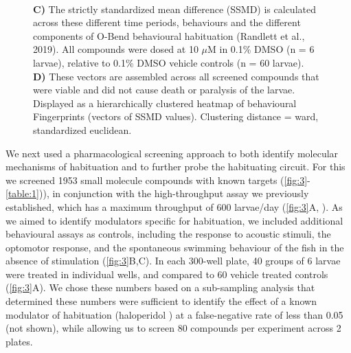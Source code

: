 \documentclass[9pt,lineno]{RandlettLab_elife}
\begin{document}
\begin{figure}
\begin{fullwidth}
\begin{center}
{\\ \textbf{C)} The strictly standardized mean difference (SSMD) is calculated across these different time periods, behaviours and the different components of O-Bend behavioural habituation (Randlett et al., 2019). All compounds were dosed at 10 $\mu$M in 0.1\% DMSO (n = 6 larvae), relative to 0.1\% DMSO vehicle controls (n = 60 larvae). 
\\ \textbf{D)} These vectors are assembled across all screened compounds that were viable and did not cause death or paralysis of the larvae. Displayed as a hierarchically clustered heatmap of behavioural Fingerprints (vectors of SSMD values). Clustering distance = ward, standardized euclidean. }
\label{fig:3}
\label{table:1}
\label{table:2}

\end{center}
\end{fullwidth}
\end{figure}


We next used a pharmacological screening approach to both identify molecular mechanisms of habituation and to further probe the habituating circuit. For this we screened 1953 small molecule compounds with known targets (\autoref{fig:3}-\autoref{table:1})), in conjunction with the high-throughput assay we previously established, which has a maximum throughput of 600 larvae/day (\autoref{fig:3}A, \citep{Randlett2019-fi}). As we aimed to identify modulators specific for habituation, we included additional behavioural assays as controls, including the response to acoustic stimuli, the optomotor response, and the spontaneous swimming behaviour of the fish in the absence of stimulation (\autoref{fig:3}B,C). In each 300-well plate, 40 groups of 6 larvae were treated in individual wells, and compared to 60 vehicle treated controls (\autoref{fig:3}A). We chose these numbers based on a sub-sampling analysis that determined these numbers were sufficient to identify the effect of a known modulator of habituation (haloperidol \citep{Randlett2019-fi}) at a false-negative rate of less than 0.05 (not shown), while allowing us to screen 80 compounds per experiment across 2 plates.
\end{document}
